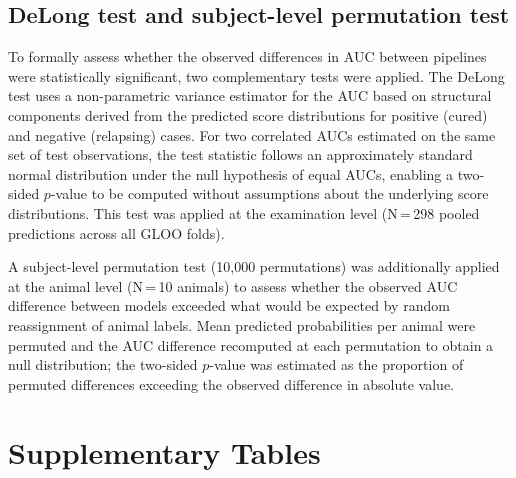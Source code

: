 \documentclass[fleqn,10pt]{wlscirep}
\begin{document}
\subsection*{DeLong test and subject-level permutation test}

To formally assess whether the observed differences in AUC between pipelines were statistically significant, two complementary tests were applied. The DeLong test \cite{DeLong1988} uses a non-parametric variance estimator for the AUC based on structural components derived from the predicted score distributions for positive (cured) and negative (relapsing) cases. For two correlated AUCs estimated on the same set of test observations, the test statistic follows an approximately standard normal distribution under the null hypothesis of equal AUCs, enabling a two-sided $p$-value to be computed without assumptions about the underlying score distributions. This test was applied at the examination level (N\,=\,298 pooled predictions across all GLOO folds).

A subject-level permutation test (10,000 permutations) was additionally applied at the animal level (N\,=\,10 animals) to assess whether the observed AUC difference between models exceeded what would be expected by random reassignment of animal labels. Mean predicted probabilities per animal were permuted and the AUC difference recomputed at each permutation to obtain a null distribution; the two-sided $p$-value was estimated as the proportion of permuted differences exceeding the observed difference in absolute value.

\section*{Supplementary Tables}
\end{document}
